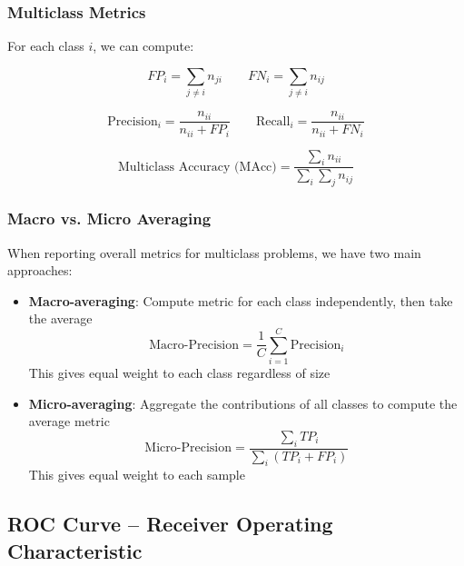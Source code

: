 \documentclass[11pt,a4paper]{article}
\theoremstyle{definition}
\theoremstyle{plain}
\theoremstyle{remark}
\begin{document}
\subsubsection{Multiclass Metrics}

For each class $i$, we can compute:

\begin{equation}
FP_i = \sum_{j \neq i} n_{ji} \quad \quad FN_i = \sum_{j \neq i} n_{ij}
\end{equation}

\begin{equation}
\text{Precision}_i = \frac{n_{ii}}{n_{ii} + FP_i} \quad \quad \text{Recall}_i = \frac{n_{ii}}{n_{ii} + FN_i}
\end{equation}

\begin{equation}
\text{Multiclass Accuracy (MAcc)} = \frac{\sum_i n_{ii}}{\sum_i \sum_j n_{ij}}
\end{equation}

\subsubsection{Macro vs. Micro Averaging}

When reporting overall metrics for multiclass problems, we have two main approaches:

\begin{itemize}
    \item \textbf{Macro-averaging}: Compute metric for each class independently, then take the average
    \begin{equation}
    \text{Macro-Precision} = \frac{1}{C} \sum_{i=1}^{C} \text{Precision}_i
    \end{equation}
    This gives equal weight to each class regardless of size
    
    \item \textbf{Micro-averaging}: Aggregate the contributions of all classes to compute the average metric
    \begin{equation}
    \text{Micro-Precision} = \frac{\sum_i TP_i}{\sum_i (TP_i + FP_i)}
    \end{equation}
    This gives equal weight to each sample
\end{itemize}

\subsection{ROC Curve -- Receiver Operating Characteristic}
\end{document}
